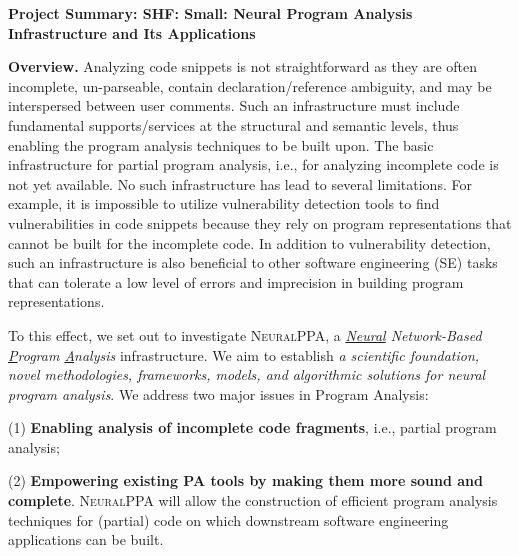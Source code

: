 \documentclass[11pt]{article}
\newcommand{\tool}{\textsc{NeuralPPA}\xspace}
\begin{document}



\begin{center}
  {\bf Project Summary: SHF: Small: Neural Program Analysis Infrastructure and Its Applications}
\end{center}
\vspace{-.1in}


{\bf Overview.}  Analyzing code snippets is not straightforward as
they are often incomplete, un-parseable, contain declaration/reference
ambiguity, and may be interspersed between user comments. Such an
infrastructure must include fundamental supports/services at the
structural and semantic levels, thus enabling the program analysis
techniques to be built upon. The basic infrastructure for partial
program analysis, i.e., for analyzing incomplete code is not yet
available. No such infrastructure has lead to several limitations. For
example, it is impossible to utilize vulnerability detection tools to
find vulnerabilities in code snippets because they rely on program
representations that cannot be built for the incomplete code. In
addition to vulnerability detection, such an infrastructure is also
beneficial to other software engineering (SE) tasks that can tolerate
a low level of errors and imprecision in building program
representations.

To this effect, we set out to investigate {\tool}, a {\em \underline{Neural} Network-Based \underline{P}rogram \underline{A}nalysis} infrastructure. We aim to establish {\em a scientific foundation, novel methodologies, frameworks, models, and algorithmic solutions for neural program analysis}. We address two major issues in Program Analysis:

(1) {\bf Enabling analysis of incomplete code fragments}, i.e.,
partial program analysis;

(2) {\bf Empowering existing PA tools by making them more sound and
  complete}. {\tool} will allow the construction of efficient program
analysis techniques for (partial) code on which downstream software
engineering applications can be built.
\end{document}
